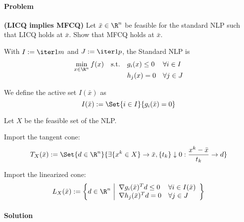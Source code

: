 \paragraph{Problem} \textbf{(LICQ implies MFCQ)} Let $\bar x\in\R^n$
be feasible for the standard NLP such that LICQ holds at $\bar x$.
Show that MFCQ holds at $\bar x$.

With $I:=\iter1m$ and $J:=\iter1p$, the Standard NLP is
\begin{equation*}
	\begin{array}{l l l l}
		\displaystyle \min_{x\in\R^n}f(x)
		 & \text{s.t.} & g_i(x)\leq0 & \forall i\in I \\
		 &             & h_j(x)=0    & \forall j\in J
	\end{array}
\end{equation*}

We define the active set $I(\bar x)$ as
$$
	I(\bar x):=\Set{i\in I}{g_i(\bar x)=0}
$$

Let $X$ be the feasible set of the NLP.

Import the tangent cone:
$$
	T_X(\bar x):=
	\Set{d\in\R^n}{\exists \{x^k\in X\}\to\bar x,\{t_k\}\downarrow0:\frac{x^k-\bar x}{t_k}\to d}
$$

Import the linearized cone:
$$
	L_X(\bar x):=\left\{ d\in\R^n\ \middle\vert
	\begin{array}{l l}
		\nabla g_i(\bar x)^Td\leq0 & \forall i\in I(\bar x) \\
		\nabla h_j(\bar x)^Td=0    & \forall j\in J
	\end{array}
	\right\}
$$

\paragraph{Solution}
